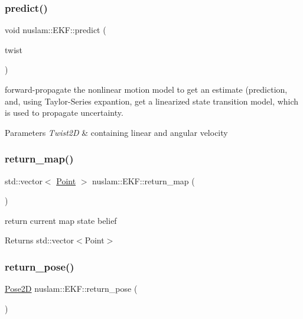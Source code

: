 \subsubsection{\texorpdfstring{predict()}{predict()}}
{\footnotesize\ttfamily void nuslam\+::\+E\+K\+F\+::predict (\begin{DoxyParamCaption}\item[{const \hyperlink{classrigid2d_1_1Twist2D}{Twist2D} \&}]{twist }\end{DoxyParamCaption})}



forward-\/propagate the nonlinear motion model to get an estimate (prediction, and, using Taylor-\/\+Series expantion, get a linearized state transition model, which is used to propagate uncertainty. 


\begin{DoxyParams}{Parameters}
{\em Twist2D} & containing linear and angular velocity \\
\hline
\end{DoxyParams}
\mbox{\label{classnuslam_1_1EKF_a9f461c60e11f23e99e04caeb76c9decc}} 
\subsubsection{\texorpdfstring{return\+\_\+map()}{return\_map()}}
{\footnotesize\ttfamily std\+::vector$<$ \hyperlink{structnuslam_1_1Point}{Point} $>$ nuslam\+::\+E\+K\+F\+::return\+\_\+map (\begin{DoxyParamCaption}{ }\end{DoxyParamCaption})}



return current map state belief 

\begin{DoxyReturn}{Returns}
std\+::vector$<$\+Point$>$ 
\end{DoxyReturn}
\mbox{\label{classnuslam_1_1EKF_a5292c5dd543b8d58edf51f7addfd7e09}} 
\subsubsection{\texorpdfstring{return\+\_\+pose()}{return\_pose()}}
{\footnotesize\ttfamily \hyperlink{structrigid2d_1_1Pose2D}{Pose2D} nuslam\+::\+E\+K\+F\+::return\+\_\+pose (\begin{DoxyParamCaption}{ }\end{DoxyParamCaption})}



